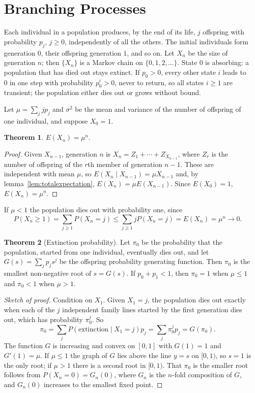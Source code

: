 \documentclass[12pt,a4paper]{report}
\theoremstyle{definition}
\newtheorem{thm}{Theorem}[section]
\begin{document}
\section{Branching Processes}

Each individual in a population produces, by the end of its life, $j$ offspring with
probability $p_j$, $j\geq 0$, independently of all the others. The initial individuals form
generation $0$, their offspring generation $1$, and so on. Let $X_n$ be the size of generation
$n$; then $\{X_n\}$ is a Markov chain on $\{0, 1, 2, \dots\}$. State $0$ is absorbing: a population
that has died out stays extinct. If $p_0>0$, every other state $i$ leads to $0$ in one step with
probability $p_0^i>0$, never to return, so all states $i\geq 1$ are transient; the population
either dies out or grows without bound.

Let $\mu = \sum_jjp_j$ and $\sigma^2$ be the mean and variance of the number of offspring of one
individual, and suppose $X_0 = 1$.

\begin{thm}
\label{thm:branchingmean}
$E(X_n) = \mu^n$.
\end{thm}

\begin{proof}
Given $X_{n-1}$, generation $n$ is $X_n = Z_1 + \cdots + Z_{X_{n-1}}$, where $Z_r$ is the number of
offspring of the $r$th member of generation $n - 1$. These are independent with mean $\mu$, so
$E(X_n\mid X_{n-1}) = \mu X_{n-1}$ and, by lemma~\ref{lem:totalexpectation},
$E(X_n) = \mu E(X_{n-1})$. Since $E(X_0) = 1$, $E(X_n) = \mu^n$.
\end{proof}

If $\mu<1$ the population dies out with probability one, since
\[P(X_n\geq 1) = \sum_{j\geq 1}P(X_n = j)\leq\sum_{j\geq 1}jP(X_n = j) = E(X_n) = \mu^n\to 0 .\]

\begin{thm}[Extinction probability]
\label{thm:extinction}
Let $\pi_0$ be the probability that the population, started from one individual, eventually
dies out, and let $G(s) = \sum_jp_js^j$ be the offspring probability generating function. Then
$\pi_0$ is the smallest non-negative root of $s = G(s)$. If $p_0 + p_1<1$, then $\pi_0 = 1$ when
$\mu\leq 1$ and $\pi_0<1$ when $\mu>1$.
\end{thm}

\begin{proof}[Sketch of proof]
Condition on $X_1$. Given $X_1 = j$, the population dies out exactly when each of the $j$
independent family lines started by the first generation dies out, which has probability
$\pi_0^j$. So
\[\pi_0 = \sum_jP(\text{extinction}\mid X_1 = j)p_j = \sum_j\pi_0^jp_j = G(\pi_0) .\]
The function $G$ is increasing and convex on $[0, 1]$ with $G(1) = 1$ and $G'(1) = \mu$. If
$\mu\leq 1$ the graph of $G$ lies above the line $y = s$ on $[0, 1)$, so $s = 1$ is the only root; if
$\mu>1$ there is a second root in $[0, 1)$. That $\pi_0$ is the smaller root follows from
$P(X_n = 0) = G_n(0)$, where $G_n$ is the $n$-fold composition of $G$, and $G_n(0)$ increases to the
smallest fixed point.
\end{proof}
\end{document}
